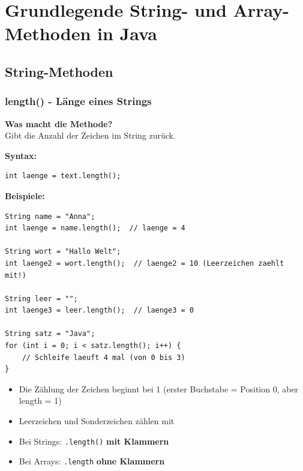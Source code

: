 \begingroup
\let\cleardoublepage\relax


\chapter*{Grundlegende String- und Array-Methoden in Java}
\label{ch:grundlegende-string-und-array-methoden-in-java}
\endgroup


\section*{String-Methoden}

\subsection*{length() - Länge eines Strings}

\textbf{Was macht die Methode?}\\
Gibt die Anzahl der Zeichen im String zurück.

\textbf{Syntax:}
\begin{lstlisting}
int laenge = text.length();
\end{lstlisting}

\textbf{Beispiele:}
\begin{lstlisting}
String name = "Anna";
int laenge = name.length();  // laenge = 4

String wort = "Hallo Welt";
int laenge2 = wort.length();  // laenge2 = 10 (Leerzeichen zaehlt mit!)

String leer = "";
int laenge3 = leer.length();  // laenge3 = 0

String satz = "Java";
for (int i = 0; i < satz.length(); i++) {
    // Schleife laeuft 4 mal (von 0 bis 3)
}
\end{lstlisting}

\begin{achtung}
	\begin{itemize}
		\item Die Zählung der Zeichen beginnt bei 1 (erster Buchstabe = Position 0, aber length = 1)
		\item Leerzeichen und Sonderzeichen zählen mit
		\item Bei Strings: \texttt{.length()} \textbf{mit Klammern}
		\item Bei Arrays: \texttt{.length} \textbf{ohne Klammern}
	\end{itemize}
\end{achtung}

